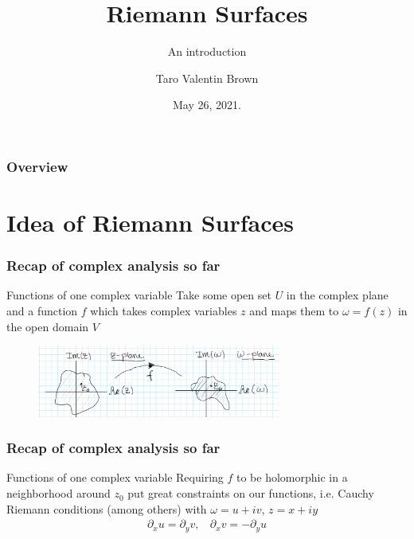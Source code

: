 \documentclass{beamer}[10]
\title{Riemann Surfaces}
\subtitle{An introduction}
\author{Taro Valentin Brown}
\institute{University of California, Davis}
\date{May 26, 2021.}
\begin{document}
\frame{\titlepage \vspace{-0.5cm}
}

\frame
{
\frametitle{Overview}
\linespread{1.5}
\tableofcontents%
}
\section{Idea of Riemann Surfaces}
\begin{frame}
	\frametitle{Recap of complex analysis so far}
	\begin{block}{Functions of one complex variable}
	Take some open set $U$ in the complex plane and a function $f$ which takes complex variables $z$ and maps them to $\omega=f(z)$ in the open domain $V$
	\end{block}
\begin{figure}
	\includegraphics[width=8cm]{1.PNG}
\end{figure}
\end{frame}

\begin{frame}
	\frametitle{Recap of complex analysis so far}
	\begin{block}{Functions of one complex variable}
	Requiring $f$ to be holomorphic in a neighborhood around $z_0$ put great constraints on our functions, i.e. Cauchy Riemann conditions (among others) with $\omega=u+iv$, $z=x+iy$
	\begin{equation}
		\begin{aligned}
			\partial_x u= \partial_y v,~~~~\partial_x v= -\partial_y u
		\end{aligned}
	\end{equation}
	\end{block}
\end{frame}
\end{document}
